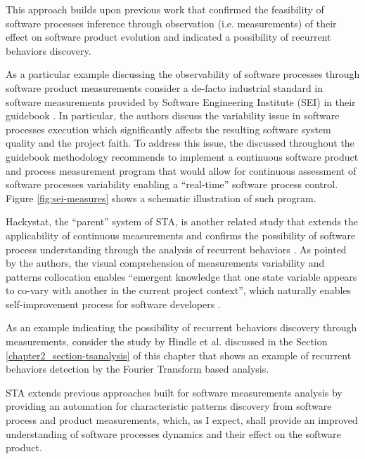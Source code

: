 This approach builds upon previous work that confirmed the feasibility of software processes inference through 
observation (i.e. measurements) of their effect on software product evolution and indicated a possibility of 
recurrent behaviors discovery. 

As a particular example discussing the observability of software processes through software product measurements 
consider a de-facto industrial standard in software measurements provided by Software Engineering Institute (SEI) in 
their guidebook \cite{citeulike:10567306}. 
In particular, the authors discuss the variability issue in software processes execution which significantly 
affects the resulting software system quality and the project faith. 
To address this issue, the discussed throughout the guidebook methodology recommends to implement a continuous 
software product and process measurement program that would allow for continuous assessment of software processes 
variability enabling a ``real-time'' software process control. Figure \ref{fig:sei-measures} shows a schematic 
illustration of such program.

Hackystat, the ``parent'' system of STA, is another related study that extends the applicability of continuous 
measurements and confirms the possibility of software process understanding through the analysis of recurrent 
behaviors \cite{citeulike:557296}. 
As pointed by the authors, the visual comprehension of measurements variability and patterns collocation enables 
``emergent knowledge that one state variable appears to co-vary with another in the current project context'',
which naturally enables self-improvement process for software developers \cite{citeulike:557296}. 

As an example indicating the possibility of recurrent behaviors discovery through measurements, consider the 
study by Hindle et al. \cite{citeulike:10377345} discussed in the Section \ref{chapter2_section-tsanalysis} of 
this chapter that shows an example of recurrent behaviors detection by the Fourier Transform based analysis.

STA extends previous approaches built for software measurements analysis by providing an automation for 
characteristic patterns discovery from software process and product measurements, which, as I expect, shall 
provide an improved understanding of software processes dynamics and their effect on the software product.

